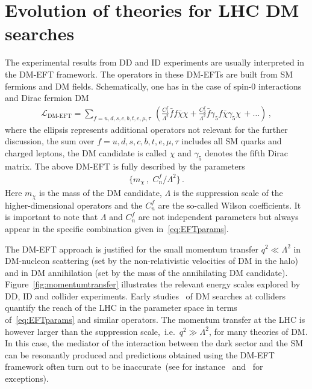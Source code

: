 \documentclass[review]{elsarticle}
\begin{document}

\section{Evolution of theories for LHC DM searches} 
\label{sec:evolution}

The experimental results from DD and ID experiments are usually interpreted in the DM-EFT framework. The operators in these DM-EFTs are built from SM fermions and DM fields. Schematically, one has in the case of spin-0 interactions and Dirac fermion DM
\begin{align}\label{eq:EFT}
\mathcal{L}_\text{DM-EFT}= \sum_{f=u,d,s,c,b,t,e,\mu,\tau} \,\left(\frac{C_{1}^f}{\Lambda^2} \bar f f \bar \chi \chi  +\frac{C_{2}^f}{\Lambda^2} \bar  f \gamma_5 f \bar \chi\gamma_5 \chi \,+\ldots \right) \,, 
\end{align}
 where the ellipsis represents additional operators not relevant for the further discussion, the sum over $f=u,d,s,c,b,t,e,\mu,\tau$ includes all SM quarks and charged leptons, the DM candidate is called $\chi$  and $\gamma_5$ denotes the fifth Dirac matrix. The above DM-EFT is fully described by the parameters
\begin{align}\label{eq:EFTparams}
\big\{ m_\chi\,,\,\, C_n^f/\Lambda^2 \big\} \,.
\end{align}
Here $m_\chi$ is the mass of the DM candidate, $\Lambda$ is the suppression scale of the higher-dimensional operators and the $C_n^f$ are the so-called Wilson coefficients. It is important to note that $\Lambda$ and $C_n^f$ are not independent parameters but always appear in the specific combination given in~\eqref{eq:EFTparams}. 

The DM-EFT approach is justified for the small momentum transfer $q^2\ll \Lambda^2$ in DM-nucleon scattering (set by the non-relativistic velocities of DM in the halo) and in DM annihilation (set by the mass of the annihilating DM candidate). Figure~\ref{fig:momentumtransfer}  illustrates the relevant energy scales explored by DD, ID and collider experiments. Early studies~\cite{Cao:2009uw,Beltran:2010ww,Goodman:2010yf,Bai:2010hh,Goodman:2010ku,Fox:2011pm} of DM searches at colliders quantify the reach of the LHC in the parameter space in terms of~\eqref{eq:EFTparams} and similar operators. The momentum transfer at the LHC is however larger than the suppression scale,~i.e.~$q^2 \gg \Lambda^2$, for many theories of DM.  In this case, the mediator of the interaction between the dark sector and the SM can be resonantly produced and predictions  obtained using the DM-EFT framework often turn out to be inaccurate~(see for instance~\cite{Bai:2010hh,Fox:2011fx,Shoemaker:2011vi,Busoni:2013lha,Buchmueller:2013dya,Busoni:2014sya,Busoni:2014haa,Racco:2015dxa} and~\cite{Bruggisser:2016nzw,Bruggisser:2016ixa} for exceptions). 
\end{document}
